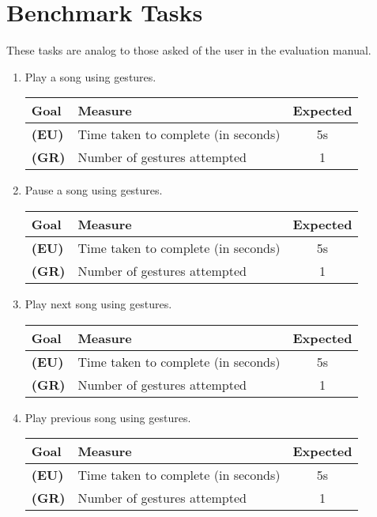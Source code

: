 \documentclass[12pt,letterpaper]{article}
\begin{document}
\section{Benchmark Tasks}
These tasks are analog to those asked of the user in the evaluation manual.
\begin{enumerate}
\item Play a song using gestures.
\begin{center}\begin{tabular}{l|l|c}
\textbf{Goal} & \textbf{Measure} & \textbf{Expected} \\
\hline
\textbf{(EU)} & Time taken to complete (in seconds) & 5s \\
\hline
\textbf{(GR)} & Number of gestures attempted & 1 \\
\hline
\end{tabular}\end{center}

\item Pause a song using gestures.
\begin{center}\begin{tabular}{l|l|c}
\textbf{Goal} & \textbf{Measure} & \textbf{Expected} \\
\hline
\textbf{(EU)} & Time taken to complete (in seconds) & 5s \\
\hline
\textbf{(GR)} & Number of gestures attempted & 1 \\
\hline
\end{tabular}\end{center}

\item Play next song using gestures.
\begin{center}\begin{tabular}{l|l|c}
\textbf{Goal} & \textbf{Measure} & \textbf{Expected} \\
\hline
\textbf{(EU)} & Time taken to complete (in seconds) & 5s \\
\hline
\textbf{(GR)} & Number of gestures attempted & 1 \\
\hline
\end{tabular}\end{center}

\item Play previous song using gestures.
\begin{center}\begin{tabular}{l|l|c}
\textbf{Goal} & \textbf{Measure} & \textbf{Expected} \\
\hline
\textbf{(EU)} & Time taken to complete (in seconds) & 5s \\
\hline
\textbf{(GR)} & Number of gestures attempted & 1 \\
\hline
\end{tabular}\end{center}


\end{enumerate}
\end{document}
